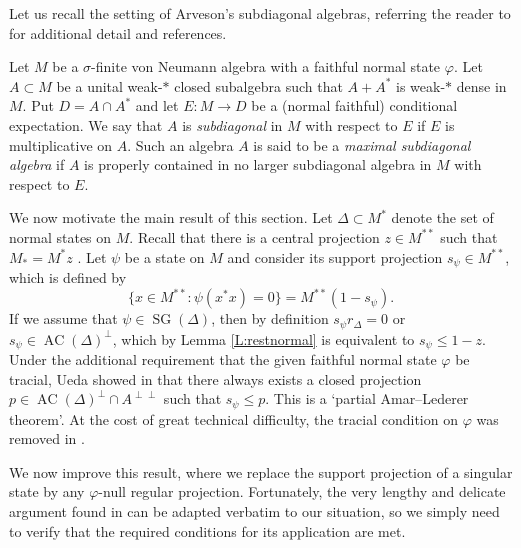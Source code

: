 \documentclass[10pt]{amsart}
\renewcommand{\phi}{\varphi}
\newcommand{\AC}{\operatorname{AC}}
\newcommand{\SG}{\operatorname{SG}}
\theoremstyle{definition}
\begin{document}
Let us recall the setting of Arveson's subdiagonal algebras,  referring the reader to \cite{BL2007, ueda2009, BL2018} for additional detail and references. 

Let $M$ be a $\sigma$-finite von Neumann algebra with a faithful normal state $\phi$.   Let $A\subset M$ be a unital weak-$*$ closed subalgebra such that $A+A^*$ is weak-$*$ dense in $M$. Put $D=A\cap A^*$ and let $E:M\to D$ be a (normal faithful) conditional expectation. We say that $A$ is \emph{subdiagonal} in $M$ with respect to $E$ if $E$ is multiplicative on $A$.  Such an algebra
$A$ is   said to be a {\em maximal subdiagonal algebra} if $A$ is properly contained in no larger subdiagonal algebra in $M$ with respect to $E$. 

We now motivate the main result of this section.  Let $\Delta\subset M^*$ denote the set of normal states on $M$. Recall that there is a central projection $z\in M^{**}$ such that $M_*=M^*z$ \cite[Theorem III.2.14]{takesaki2002}.  Let $\psi$ be a state on $M$ and consider its support projection $s_\psi\in M^{**}$, which is defined by
\[
\{x\in M^{**}:\psi(x^*x)=0\}=M^{**}(1-s_\psi).
\]
If we assume that $\psi\in \SG(\Delta)$, then by definition $s_\psi r_\Delta=0$ or $s_\psi\in \AC(\Delta)^\perp$, which by Lemma \ref{L:restnormal} is equivalent to $s_\psi\leq 1-z$. Under the additional requirement that the given faithful normal state $\phi$ be tracial, Ueda showed in \cite{ueda2009} that there always exists a closed projection $p\in \AC(\Delta)^\perp\cap A^{\perp\perp}$ such that $s_\psi\leq p$. 
This is a `partial Amar--Lederer theorem'.  At the cost of great technical difficulty, the tracial condition on $\phi$ was removed in \cite{BL2018}.


We now improve this result, where we replace the support projection of a singular state by any $\phi$-null regular projection. Fortunately, the very lengthy and 
delicate argument found in \cite{BL2018} can be adapted verbatim to our situation, so we simply need to verify that the required conditions for its application are met. 
\end{document}
